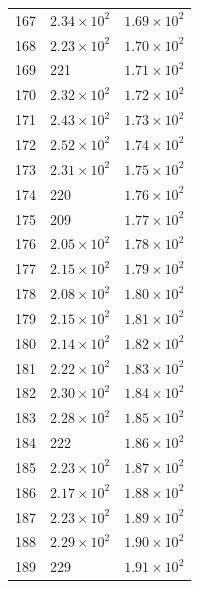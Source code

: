 \begin{table}[H]
\begin{tabular}{lll}
167 & $\displaystyle 2.34 \times 10^{2}$ & $\displaystyle 1.69 \times 10^{2}$ \\
168 & $\displaystyle 2.23 \times 10^{2}$ & $\displaystyle 1.70 \times 10^{2}$ \\
169 & 221 & $\displaystyle 1.71 \times 10^{2}$ \\
170 & $\displaystyle 2.32 \times 10^{2}$ & $\displaystyle 1.72 \times 10^{2}$ \\
171 & $\displaystyle 2.43 \times 10^{2}$ & $\displaystyle 1.73 \times 10^{2}$ \\
172 & $\displaystyle 2.52 \times 10^{2}$ & $\displaystyle 1.74 \times 10^{2}$ \\
173 & $\displaystyle 2.31 \times 10^{2}$ & $\displaystyle 1.75 \times 10^{2}$ \\
174 & 220 & $\displaystyle 1.76 \times 10^{2}$ \\
175 & 209 & $\displaystyle 1.77 \times 10^{2}$ \\
176 & $\displaystyle 2.05 \times 10^{2}$ & $\displaystyle 1.78 \times 10^{2}$ \\
177 & $\displaystyle 2.15 \times 10^{2}$ & $\displaystyle 1.79 \times 10^{2}$ \\
178 & $\displaystyle 2.08 \times 10^{2}$ & $\displaystyle 1.80 \times 10^{2}$ \\
179 & $\displaystyle 2.15 \times 10^{2}$ & $\displaystyle 1.81 \times 10^{2}$ \\
180 & $\displaystyle 2.14 \times 10^{2}$ & $\displaystyle 1.82 \times 10^{2}$ \\
181 & $\displaystyle 2.22 \times 10^{2}$ & $\displaystyle 1.83 \times 10^{2}$ \\
182 & $\displaystyle 2.30 \times 10^{2}$ & $\displaystyle 1.84 \times 10^{2}$ \\
183 & $\displaystyle 2.28 \times 10^{2}$ & $\displaystyle 1.85 \times 10^{2}$ \\
184 & 222 & $\displaystyle 1.86 \times 10^{2}$ \\
185 & $\displaystyle 2.23 \times 10^{2}$ & $\displaystyle 1.87 \times 10^{2}$ \\
186 & $\displaystyle 2.17 \times 10^{2}$ & $\displaystyle 1.88 \times 10^{2}$ \\
187 & $\displaystyle 2.23 \times 10^{2}$ & $\displaystyle 1.89 \times 10^{2}$ \\
188 & $\displaystyle 2.29 \times 10^{2}$ & $\displaystyle 1.90 \times 10^{2}$ \\
189 & 229 & $\displaystyle 1.91 \times 10^{2}$ \\

\end{tabular}
\end{table}
